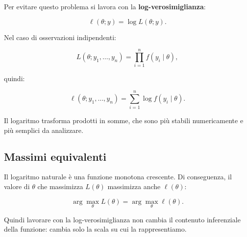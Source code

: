 \documentclass[
  italian,
  letterpaper,
  a4paper,
  11pt,
  open=any]{scrbook}
\theoremstyle{plain}
\theoremstyle{definition}
\theoremstyle{definition}
\theoremstyle{remark}
\begin{document}
Per evitare questo problema si lavora con la
\textbf{log-verosimiglianza}:

\[
\ell(\theta; y) = \log L(\theta; y).
\]

Nel caso di osservazioni indipendenti:

\[
L(\theta; y_1, \ldots, y_n) = \prod_{i=1}^{n} f(y_i \mid \theta),
\]

quindi:

\[
\ell(\theta; y_1, \ldots, y_n)
= \sum_{i=1}^{n} \log f(y_i \mid \theta).
\]

Il logaritmo trasforma prodotti in somme, che sono più stabili
numericamente e più semplici da analizzare.

\subsection{Massimi equivalenti}\label{massimi-equivalenti}

Il logaritmo naturale è una funzione monotona crescente. Di conseguenza,
il valore di \(\theta\) che massimizza \(L(\theta)\) massimizza anche
\(\ell(\theta)\):

\[
\arg\max_\theta L(\theta) = \arg\max_\theta \ell(\theta).
\]

Quindi lavorare con la log-verosimiglianza non cambia il contenuto
inferenziale della funzione: cambia solo la scala su cui la
rappresentiamo.
\end{document}
